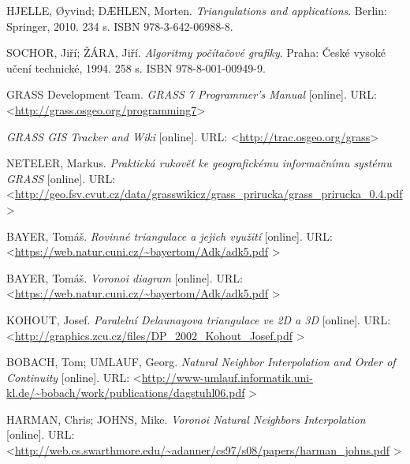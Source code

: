 \documentclass[12pt,a4paper]{article}
\renewcommand\baselinestretch{1.3}		%
\begin{document}
\newpage
\renewcommand\baselinestretch{1.2}
\selectfont
\renewcommand{\refname}{Použité zdroje}
\addcontentsline{toc}{section}{\refname}


\begin{thebibliography}{99}
\label{literatura}


HJELLE, Øyvind; DÆHLEN, Morten. \textit{Triangulations and applications}. Berlin: Springer, 2010. 234 s. ISBN 978-3-642-06988-8.


SOCHOR, Jiří; ŽÁRA, Jiří. \textit{Algoritmy počítačové grafiky}. Praha: České vysoké učení technické, 1994. 258 s. ISBN 978-8-001-00949-9.


GRASS Development Team. \textit{GRASS 7 Programmer's Manual} [online].
URL: \textless\url{http://grass.osgeo.org/programming7}\textgreater


\textit{GRASS GIS Tracker and Wiki} [online]. 
URL: \textless\url{http://trac.osgeo.org/grass}\textgreater


NETELER, Markus. \textit{Praktická rukověť ke geografickému informačnímu systému GRASS} [online].
URL: \textless\url{http://geo.fsv.cvut.cz/data/grasswikicz/grass_prirucka/grass_prirucka_0.4.pdf}
\textgreater

BAYER, Tomáš. \textit{Rovinné triangulace a jejich využití} [online].
URL: \textless\url{https://web.natur.cuni.cz/~bayertom/Adk/adk5.pdf}
\textgreater

BAYER, Tomáš. \textit{Voronoi diagram} [online].
URL: \textless\url{https://web.natur.cuni.cz/~bayertom/Adk/adk5.pdf}
\textgreater

KOHOUT, Josef. \textit{Paralelní Delaunayova triangulace
ve 2D a 3D} [online].
URL: \textless\url{http://graphics.zcu.cz/files/DP_2002_Kohout_Josef.pdf}
\textgreater

BOBACH, Tom; UMLAUF, Georg. \textit{Natural Neighbor Interpolation and Order of Continuity} [online].
URL: \textless\url{http://www-umlauf.informatik.uni-kl.de/~bobach/work/publications/dagstuhl06.pdf}
\textgreater

HARMAN, Chris; JOHNS, Mike. \textit{Voronoi Natural Neighbors Interpolation} [online].
URL: \textless\url{http://web.cs.swarthmore.edu/~adanner/cs97/s08/papers/harman_johns.pdf}
\textgreater


\end{thebibliography}
\end{document}
